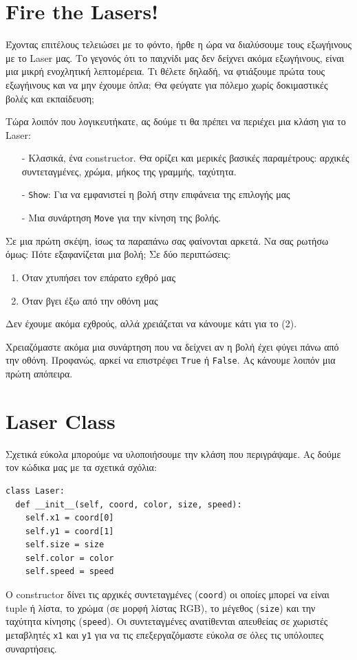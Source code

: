 \section{Fire the Lasers!}
%
Έχοντας επιτέλους τελειώσει με το φόντο, ήρθε η ώρα να διαλύσουμε τους εξωγήινους με το Laser μας. Το γεγονός ότι το παιχνίδι μας δεν δείχνει ακόμα εξωγήινους, είναι μια μικρή ενοχλητική λεπτομέρεια. Τι θέλετε δηλαδή, να φτιάξουμε πρώτα τους εξωγήινους και να μην έχουμε όπλα; Θα φεύγατε για πόλεμο χωρίς δοκιμαστικές βολές και εκπαίδευση;

Τώρα λοιπόν που λογικευτήκατε, ας δούμε τι θα πρέπει να περιέχει μια κλάση για το Laser:
%
\begin{itemize}
\item[-] Κλασικά, ένα constructor. Θα ορίζει και μερικές βασικές παραμέτρους: αρχικές συντεταγμένες, χρώμα, μήκος της γραμμής, ταχύτητα.
\item[-] {\tt Show}: Για να εμφανιστεί η βολή στην επιφάνεια της επιλογής μας
\item[-] Μια συνάρτηση {\tt Move} για την κίνηση της βολής.
\end{itemize}
%
Σε μια πρώτη σκέψη, ίσως τα παραπάνω σας φαίνονται αρκετά. Να σας ρωτήσω όμως: Πότε εξαφανίζεται μια βολή; Σε δύο περιπτώσεις:
%
\begin{enumerate}
\item Όταν χτυπήσει τον επάρατο εχθρό μας
\item Όταν βγει έξω από την οθόνη μας
\end{enumerate}
%
Δεν έχουμε ακόμα εχθρούς, αλλά χρειάζεται να κάνουμε κάτι για το (2).

Χρειαζόμαστε ακόμα μια συνάρτηση που να δείχνει αν η βολή έχει φύγει πάνω από την οθόνη.  Προφανώς, αρκεί να επιστρέφει {\tt True} ή {\tt False}.
Ας κάνουμε λοιπόν μια πρώτη απόπειρα.
%
\section{Laser Class}
%
Σχετικά εύκολα μπορούμε να υλοποιήσουμε την κλάση που περιγράψαμε. Ας δούμε τον κώδικα μας με τα σχετικά σχόλια:

\begin{verbatim}
class Laser:
  def __init__(self, coord, color, size, speed):
    self.x1 = coord[0]
    self.y1 = coord[1]
    self.size = size
    self.color = color
    self.speed = speed
\end{verbatim}

O constructor δίνει τις αρχικές συντεταγμένες ({\tt coord}) οι οποίες μπορεί να είναι tuple ή λίστα, το χρώμα (σε μορφή λίστας RGB), το μέγεθος ({\tt size}) και την ταχύτητα κίνησης ({\tt speed}). Οι συντεταγμένες ανατίθενται απευθείας σε χωριστές μεταβλητές {\tt x1} και {\tt y1} για να τις επεξεργαζόμαστε εύκολα σε όλες τις υπόλοιπες συναρτήσεις. 


